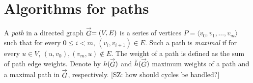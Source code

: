\section{Algorithms for paths}

A \emph{path} in a directed graph $\stackrel{\rightarrow}{G} = (V, E)$ is a series of vertices $P = \langle v_0, v_1, \ldots, v_m\rangle$ such that for every $0 \leq i < m$, $(v_i, v_{i+1}) \in E$. Such a path is \emph{maximal} if for every $u \in V$, $(u, v_0), (v_m, u) \notin E$. The weight of a path is defined as the sum of path edge weights. Denote by $h(\stackrel{\rightarrow}{G})$ and $\tilde{h}(\stackrel{\rightarrow}{G})$ maximum weights of a path and a maximal path in $\stackrel{\rightarrow}{G}$, respectively. [SZ: how should cycles be handled?]


